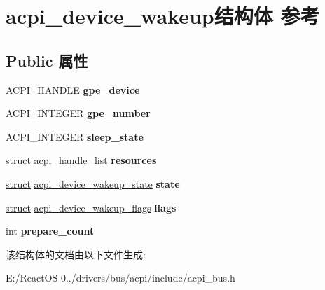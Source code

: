 \hypertarget{structacpi__device__wakeup}{}\section{acpi\+\_\+device\+\_\+wakeup结构体 参考}
\label{structacpi__device__wakeup}
\subsection*{Public 属性}
\begin{DoxyCompactItemize}
\item 
\mbox{\label{structacpi__device__wakeup_a63a73ea56765e038a4e243f8f54e5b27}} 
\hyperlink{interfacevoid}{A\+C\+P\+I\+\_\+\+H\+A\+N\+D\+LE} {\bfseries gpe\+\_\+device}
\item 
\mbox{\label{structacpi__device__wakeup_a96f4db2740a4f1f245c592211425cb9c}} 
A\+C\+P\+I\+\_\+\+I\+N\+T\+E\+G\+ER {\bfseries gpe\+\_\+number}
\item 
\mbox{\label{structacpi__device__wakeup_ab60dd288afdc207a24bc1aa7a6416d1f}} 
A\+C\+P\+I\+\_\+\+I\+N\+T\+E\+G\+ER {\bfseries sleep\+\_\+state}
\item 
\mbox{\label{structacpi__device__wakeup_a8164d6d76665ca99629a147e707a4abc}} 
\hyperlink{interfacestruct}{struct} \hyperlink{structacpi__handle__list}{acpi\+\_\+handle\+\_\+list} {\bfseries resources}
\item 
\mbox{\label{structacpi__device__wakeup_aa9d8dcafc756e999d6d2886220c1ffa0}} 
\hyperlink{interfacestruct}{struct} \hyperlink{structacpi__device__wakeup__state}{acpi\+\_\+device\+\_\+wakeup\+\_\+state} {\bfseries state}
\item 
\mbox{\label{structacpi__device__wakeup_a5520441bb03ce21420b48746efc24bce}} 
\hyperlink{interfacestruct}{struct} \hyperlink{structacpi__device__wakeup__flags}{acpi\+\_\+device\+\_\+wakeup\+\_\+flags} {\bfseries flags}
\item 
\mbox{\label{structacpi__device__wakeup_a81fae1c1cfc43e861b771fc86069a3e8}} 
int {\bfseries prepare\+\_\+count}
\end{DoxyCompactItemize}


该结构体的文档由以下文件生成\+:\begin{DoxyCompactItemize}
\item 
E\+:/\+React\+O\+S-\/0../drivers/bus/acpi/include/acpi\+\_\+bus.\+h\end{DoxyCompactItemize}
